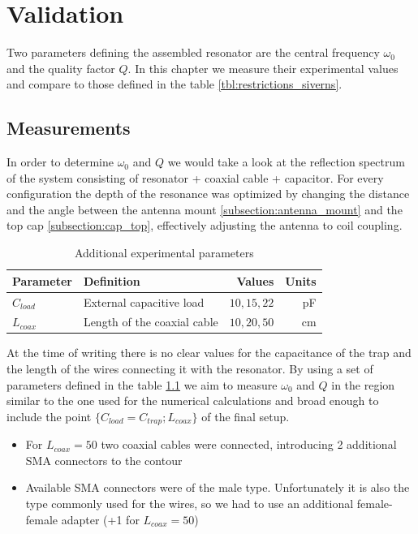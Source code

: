 \chapter{Validation}

Two parameters defining the assembled resonator are the central frequency $\omega_0$ and the quality factor $Q$. In this chapter we measure their experimental values and compare to those defined in the table \ref{tbl:restrictions_siverns}.

\section{Measurements}

In order to determine $\omega_0$ and $Q$ we would take a look at the reflection spectrum of the system consisting of resonator + coaxial cable + capacitor. For every configuration the depth of the resonance was optimized by changing the distance and the angle between the antenna mount \ref{subsection:antenna_mount} and the top cap \ref{subsection:cap_top}, effectively adjusting the antenna to coil coupling. 

\begin{table}[h]
\centering
\begin{tabular}{| l | l | r | r |}
	\hline
	Parameter & Definition & Values & Units\\
	\hline \hline
	$C_{load}$ & External capacitive load & $10,15,22$ & pF\\
	\hline
	$L_{coax}$ & Length of the coaxial cable & $10, 20, 50$ & cm\\
	\hline
\end{tabular}
\label{tbl:experimental_parameters}
\caption{Additional experimental parameters}
\end{table}

At the time of writing there is no clear values for the capacitance of the trap and the length of the wires connecting it with the resonator. By using a set of parameters defined in the table \ref{tbl:experimental_parameters} we aim to measure $\omega_0$ and $Q$ in the region similar to the one used for the numerical calculations and broad enough to include the point $\{C_{load} = C_{trap}; L_{coax}\}$ of the final setup.

\begin{itemize}
	\item For $L_{coax}=50$ two coaxial cables were connected, introducing 2 additional SMA connectors to the contour
	\item Available SMA connectors were of the male type. Unfortunately it is also the type commonly used for the wires, so we had to use an additional female-female adapter (+1 for $L_{coax} = 50$)
\end{itemize}


